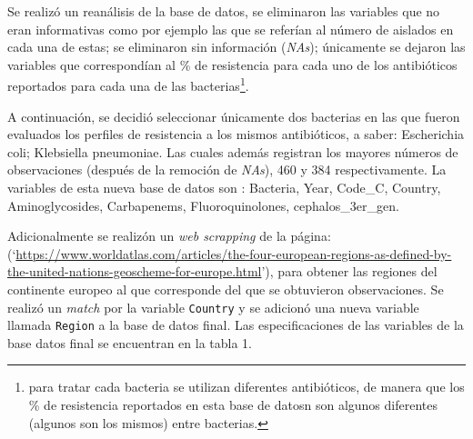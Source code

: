 \documentclass[
]{article}
\begin{document}
Se realizó un reanálisis de la base de datos, se eliminaron las
variables que no eran informativas como por ejemplo las que se referían
al número de aislados en cada una de estas; se eliminaron sin
información (\emph{NAs}); únicamente se dejaron las variables que
correspondían al \% de resistencia para cada uno de los antibióticos
reportados para cada una de las bacterias\footnote{para tratar cada
  bacteria se utilizan diferentes antibióticos, de manera que los \% de
  resistencia reportados en esta base de datosn son algunos diferentes
  (algunos son los mismos) entre bacterias.}.

A continuación, se decidió seleccionar únicamente dos bacterias en las
que fueron evaluados los perfiles de resistencia a los mismos
antibióticos, a saber: Escherichia coli; Klebsiella pneumoniae. Las
cuales además registran los mayores números de observaciones (después de
la remoción de \emph{NAs}), 460 y 384 respectivamente. La variables de
esta nueva base de datos son : Bacteria, Year, Code\_C, Country,
Aminoglycosides, Carbapenems, Fluoroquinolones, cephalos\_3er\_gen.

Adicionalmente se realizón un \emph{web scrapping} de la página:
(`\url{https://www.worldatlas.com/articles/the-four-european-regions-as-defined-by-the-united-nations-geoscheme-for-europe.html}'),
para obtener las regiones del continente europeo al que corresponde del
que se obtuvieron observaciones. Se realizó un \emph{match} por la
variable \texttt{Country} y se adicionó una nueva variable llamada
\texttt{Region} a la base de datos final. Las especificaciones de las
variables de la base datos final se encuentran en la tabla 1.
\end{document}
